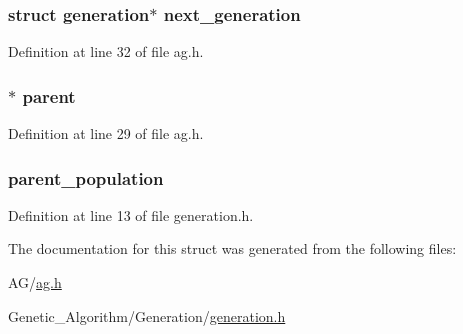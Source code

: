 \subsubsection[{next\+\_\+generation}]{\setlength{\rightskip}{0pt plus 5cm}struct {\bf generation}$\ast$ next\+\_\+generation}\label{structgeneration_ad06847c56015bc8869688d186d511430}


Definition at line 32 of file ag.\+h.

\hypertarget{structgeneration_acd37977cdf23d81885f3ebf739c2f22b}{}
\subsubsection[{parent}]{$\ast$ parent}\label{structgeneration_acd37977cdf23d81885f3ebf739c2f22b}


Definition at line 29 of file ag.\+h.

\hypertarget{structgeneration_a279d4e7b5c451add6581f575ec8cbe13}{}
\subsubsection[{parent\+\_\+population}]{ parent\+\_\+population}\label{structgeneration_a279d4e7b5c451add6581f575ec8cbe13}


Definition at line 13 of file generation.\+h.



The documentation for this struct was generated from the following files\+:\begin{DoxyCompactItemize}
\item 
A\+G/\hyperlink{ag_8h}{ag.\+h}\item 
Genetic\+\_\+\+Algorithm/\+Generation/\hyperlink{generation_8h}{generation.\+h}\end{DoxyCompactItemize}
